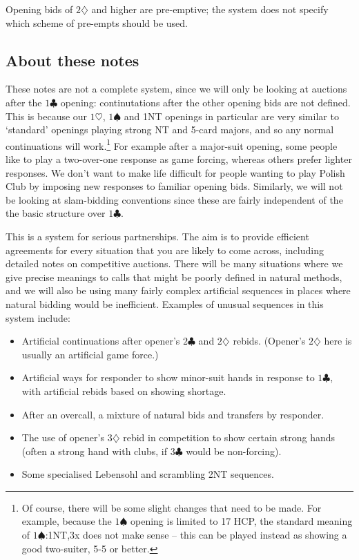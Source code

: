 \documentclass{article}
\newcommand{\sz}{\spadesuit}
\newcommand{\hz}{\heartsuit}
\newcommand{\dz}{\diamondsuit}
\newcommand{\cz}{\clubsuit}
\begin{document}
Opening bids of $2\dz$ and higher are pre-emptive; the system does not specify which scheme of pre-empts should be used.

\subsection{About these notes}

These notes are not a complete system, since we will only be looking at auctions after the $1\cz$ opening: continutations after the other opening bids are not defined. This is because our $1\hz$, $1\sz$ and 1NT openings in particular are very similar to `standard' openings playing strong NT and 5-card majors, and so any normal continuations will work.\footnote{Of course, there will be some slight changes that need to be made. For example, because the $1\sz$ opening is limited to 17 HCP, the standard meaning of $1\sz$:1NT,3x does not make sense -- this can be played instead as showing a good two-suiter, 5-5 or better.} For example after a major-suit opening, some people like to play a two-over-one response as game forcing, whereas others prefer lighter responses. We don't want to make life difficult for people wanting to play Polish Club by imposing new responses to familiar opening bids. Similarly, we will not be looking at slam-bidding conventions since these are fairly independent of the the basic structure over $1\cz$.

This is a system for serious partnerships. The aim is to provide efficient agreements for every situation that you are likely to come across, including detailed notes on competitive auctions. There will be many situations where we give precise meanings to calls that might be poorly defined in natural methods, and we will also be using many fairly complex artificial sequences in places where natural bidding would be inefficient. Examples of unusual sequences in this system include:
\begin{itemize}
\item Artificial continuations after opener's $2\cz$ and $2\dz$ rebids. (Opener's $2\dz$ here is usually an artificial game force.)
\item Artificial ways for responder to show minor-suit hands in response to $1\cz$, with artificial rebids based on showing shortage.
\item After an overcall, a mixture of natural bids and transfers by responder.
\item The use of opener's $3\dz$ rebid in competition to show certain strong hands (often a strong hand with clubs, if $3\cz$ would be non-forcing).
\item Some specialised Lebensohl and scrambling 2NT sequences.
\end{itemize}
\end{document}
